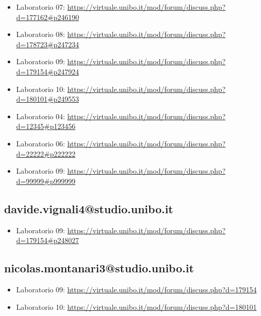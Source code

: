 \documentclass[a4paper,12pt]{report}
\begin{document}
\begin{itemize}
\item Laboratorio 07: \url{https://virtuale.unibo.it/mod/forum/discuss.php?d=177162#p246190}
 \item Laboratorio 08: \url{https://virtuale.unibo.it/mod/forum/discuss.php?d=178723#p247234}
 \item Laboratorio 09: \url{https://virtuale.unibo.it/mod/forum/discuss.php?d=179154#p247924}
 \item Laboratorio 10: \url{https://virtuale.unibo.it/mod/forum/discuss.php?d=180101#p249553}
 \item Laboratorio 04: \url{https://virtuale.unibo.it/mod/forum/discuss.php?d=12345#p123456}
 \item Laboratorio 06: \url{https://virtuale.unibo.it/mod/forum/discuss.php?d=22222#p222222}
 \item Laboratorio 09: \url{https://virtuale.unibo.it/mod/forum/discuss.php?d=99999#p999999}
\end{itemize}

\subsection{davide.vignali4@studio.unibo.it}

\begin{itemize}
 \item Laboratorio 09: \url{https://virtuale.unibo.it/mod/forum/discuss.php?d=179154#p248027}
\end{itemize}

\subsection{nicolas.montanari3@studio.unibo.it}

\begin{itemize}
 \item Laboratorio 09: \url{https://virtuale.unibo.it/mod/forum/discuss.php?d=179154}
 \item Laboratorio 10: \url{https://virtuale.unibo.it/mod/forum/discuss.php?d=180101}
\end{itemize}




\end{document}
